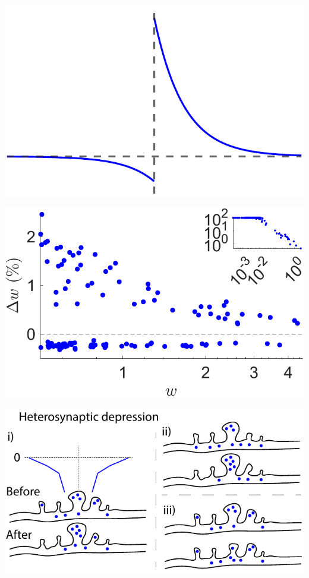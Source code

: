 \documentclass[utf8]{FrontiersinHarvard} %
\begin{document}
\begin{subfigure}
\begin{minipage}[b]{0.25\textwidth}
        \includegraphics[width=\linewidth]{methods/STDP}
        \caption{}
        \label{figs:methods:STDP}
    \end{minipage}%
\setcounter{figure}{1}
\setcounter{subfigure}{3}
    \begin{minipage}[b]{0.32\textwidth}
        \includegraphics[width=\linewidth]{methods/dependence}
        \caption{}
        \label{figs:methods:weight_dependence}
    \end{minipage}%
\setcounter{figure}{1}
\setcounter{subfigure}{4}
    \begin{minipage}[b]{0.49\textwidth}
        \includegraphics[width=\linewidth]{methods/heterosynaptic_plasticity_model}

\end{minipage}
\end{subfigure}
\end{document}
